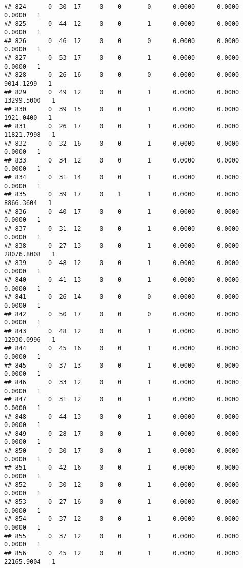 \documentclass[
]{article}
\begin{document}
\begin{enumerate}
\begin{verbatim}
## 824      0  30  17     0    0       0      0.0000      0.0000      0.0000   1
## 825      0  44  12     0    0       1      0.0000      0.0000      0.0000   1
## 826      0  46  12     0    0       0      0.0000      0.0000      0.0000   1
## 827      0  53  17     0    0       1      0.0000      0.0000      0.0000   1
## 828      0  26  16     0    0       0      0.0000      0.0000   9014.1299   1
## 829      0  49  12     0    0       1      0.0000      0.0000  13299.5000   1
## 830      0  39  15     0    0       1      0.0000      0.0000   1921.0400   1
## 831      0  26  17     0    0       1      0.0000      0.0000  11821.7998   1
## 832      0  32  16     0    0       1      0.0000      0.0000      0.0000   1
## 833      0  34  12     0    0       1      0.0000      0.0000      0.0000   1
## 834      0  31  14     0    0       1      0.0000      0.0000      0.0000   1
## 835      0  39  17     0    1       1      0.0000      0.0000   8866.3604   1
## 836      0  40  17     0    0       1      0.0000      0.0000      0.0000   1
## 837      0  31  12     0    0       1      0.0000      0.0000      0.0000   1
## 838      0  27  13     0    0       1      0.0000      0.0000  28076.8008   1
## 839      0  48  12     0    0       1      0.0000      0.0000      0.0000   1
## 840      0  41  13     0    0       1      0.0000      0.0000      0.0000   1
## 841      0  26  14     0    0       0      0.0000      0.0000      0.0000   1
## 842      0  50  17     0    0       0      0.0000      0.0000      0.0000   1
## 843      0  48  12     0    0       1      0.0000      0.0000  12930.0996   1
## 844      0  45  16     0    0       1      0.0000      0.0000      0.0000   1
## 845      0  37  13     0    0       1      0.0000      0.0000      0.0000   1
## 846      0  33  12     0    0       1      0.0000      0.0000      0.0000   1
## 847      0  31  12     0    0       1      0.0000      0.0000      0.0000   1
## 848      0  44  13     0    0       1      0.0000      0.0000      0.0000   1
## 849      0  28  17     0    0       1      0.0000      0.0000      0.0000   1
## 850      0  30  17     0    0       1      0.0000      0.0000      0.0000   1
## 851      0  42  16     0    0       1      0.0000      0.0000      0.0000   1
## 852      0  30  12     0    0       1      0.0000      0.0000      0.0000   1
## 853      0  27  16     0    0       1      0.0000      0.0000      0.0000   1
## 854      0  37  12     0    0       1      0.0000      0.0000      0.0000   1
## 855      0  37  12     0    0       1      0.0000      0.0000      0.0000   1
## 856      0  45  12     0    0       1      0.0000      0.0000  22165.9004   1

\end{verbatim}
\end{enumerate}
\end{document}
